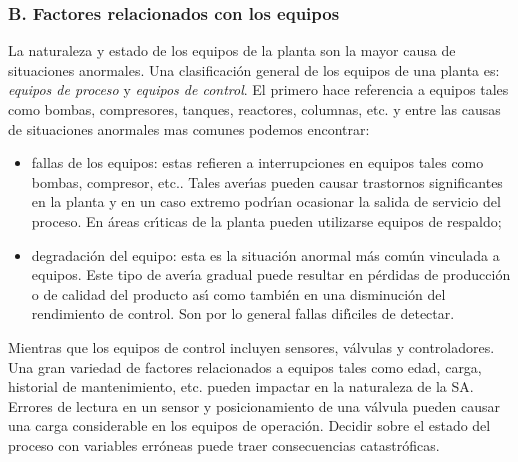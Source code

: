 \subsubsection{B. Factores relacionados con los equipos}
La naturaleza y estado de los equipos de la planta son la mayor causa de situaciones anormales. Una
clasificaci{\'o}n general de los equipos de una planta es: \textit{equipos de proceso} y \textit{equipos de
control}.  El primero hace referencia a equipos tales como bombas, compresores, tanques, reactores,
columnas, etc. y entre las causas de situaciones anormales mas comunes podemos encontrar:
\begin{itemize}
    \item fallas de los equipos: estas refieren a interrupciones en equipos tales como bombas, compresor,
    etc.. Tales aver{\'\i}as pueden causar trastornos significantes en la planta y en un caso extremo podr{\'\i}an
    ocasionar la salida de servicio del proceso. En {\'a}reas cr{\'\i}ticas de la planta pueden utilizarse equipos de
    respaldo;
    \item degradaci{\'o}n del equipo: esta es la situaci{\'o}n anormal m{\'a}s com{\'u}n vinculada a equipos. Este tipo de
    aver{\'\i}a gradual puede resultar en p{\'e}rdidas de producci{\'o}n o de calidad del producto as{\'\i} como tambi{\'e}n en
    una disminuci{\'o}n del rendimiento de control. Son por lo general fallas dif{\'\i}ciles de detectar.
\end{itemize}

Mientras que los equipos de control incluyen sensores, v{\'a}lvulas y controladores. Una gran variedad de
factores relacionados a equipos tales como edad, carga, historial de mantenimiento, etc. pueden impactar en
la naturaleza de la SA. Errores de lectura en un sensor y posicionamiento de una v{\'a}lvula pueden causar una
carga considerable en los equipos de operaci{\'o}n. Decidir sobre el estado del proceso con variables err{\'o}neas
puede traer consecuencias catastr{\'o}ficas.

